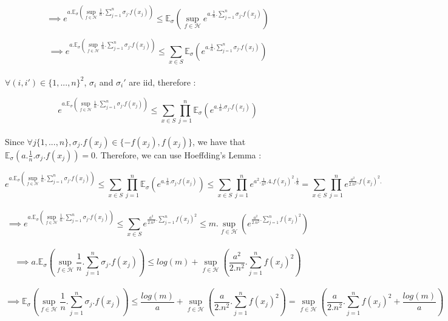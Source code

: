 \documentclass[final,3p,times,12pt]{article}
\begin{document}
\[ \implies
e^{a.\mathbb{E}_{\sigma}\left(\sup_{f\in \mathcal{H}} \frac{1}{n}.\sum_{j=1}^n \sigma_j.f(x_j)\right)} \leq \mathbb{E}_{\sigma}\left(\sup_{f\in \mathcal{H}}e^{a.\frac{1}{n}.\sum_{j=1}^n \sigma_j.f(x_j)}\right)
\]

\[ \implies
e^{a.\mathbb{E}_{\sigma}\left(\sup_{f\in \mathcal{H}} \frac{1}{n}.\sum_{j=1}^n \sigma_j.f(x_j)\right)} \leq \sum_{x\in S}\mathbb{E}_{\sigma}\left(e^{a.\frac{1}{n}.\sum_{j=1}^n \sigma_j.f(x_j)}\right)
\] \\

$\forall (i,i') \in \{1, ...,n\}^2$, $\sigma_i$ and  $\sigma_i'$ are iid, therefore : 

\[
e^{a.\mathbb{E}_{\sigma}\left(\sup_{f\in \mathcal{H}} \frac{1}{n}.\sum_{j=1}^n \sigma_j.f(x_j)\right)} \leq  \sum_{x\in S}\prod_{j=1}^n\mathbb{E}_{\sigma}\left(e^{a.\frac{1}{n}. \sigma_j.f(x_j)}\right)
\] \\

Since $\forall j \{1, ..., n\}, \sigma_j.f(x_j) \in \{-f(x_j),f(x_j)\}$, we have that $\mathbb{E}_{\sigma}\left(a.\frac{1}{n}. \sigma_j.f(x_j)\right) = 0$. Therefore, we can use Hoeffding’s Lemma : 

\[
e^{a.\mathbb{E}_{\sigma}\left(\sup_{f\in \mathcal{H}} \frac{1}{n}.\sum_{j=1}^n \sigma_j.f(x_j)\right)} \leq  \sum_{x\in S}\prod_{j=1}^n\mathbb{E}_{\sigma}\left(e^{a.\frac{1}{n}. \sigma_j.f(x_j)}\right) \leq \sum_{x\in S}\prod_{j=1}^n e^{a^2.\frac{1}{n^2}. 4.f(x_j)^2.\frac{1}{8}} = \sum_{x\in S}\prod_{j=1}^n e^{\frac{a^2}{2.n^2}.f(x_j)^2.}
\] \\

\[ \implies
e^{a.\mathbb{E}_{\sigma}\left(\sup_{f\in \mathcal{H}} \frac{1}{n}.\sum_{j=1}^n \sigma_j.f(x_j)\right)} \leq \sum_{x\in S} e^{\frac{a^2}{2.n^2}.\sum_{j=1}^nf(x_j)^2} \leq m.\sup_{f\in \mathcal{H}}\left(e^{\frac{a^2}{2.n^2}.\sum_{j=1}^nf(x_j)^2}\right)
\] \\

\[ \implies
a.\mathbb{E}_{\sigma}\left(\sup_{f\in \mathcal{H}} \frac{1}{n}.\sum_{j=1}^n \sigma_j.f(x_j)\right) \leq log(m)+\sup_{f\in \mathcal{H}}\left(\frac{a^2}{2.n^2}.\sum_{j=1}^nf(x_j)^2\right)
\] \\

\[ \implies
\mathbb{E}_{\sigma}\left(\sup_{f\in \mathcal{H}} \frac{1}{n}.\sum_{j=1}^n \sigma_j.f(x_j)\right) \leq \frac{log(m)}{a}+ \sup_{f\in \mathcal{H}}(\frac{a}{2.n^2}.\sum_{j=1}^nf(x_j)^2) = \sup_{f\in \mathcal{H}}(\frac{a}{2.n^2}.\sum_{j=1}^nf(x_j)^2 + \frac{log(m)}{a})
\] \\
\end{document}
